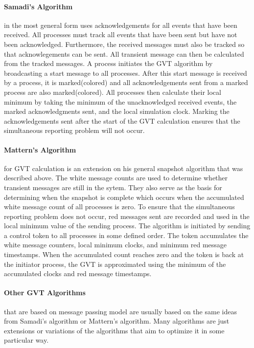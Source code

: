 \documentclass[11pt]{book}
\begin{document}
\paragraph{Samadi's Algorithm}\cite{samadi-85} in the most general form uses acknowledgements
for all events that have been received.  All processes must track all events that have been
sent but have not been acknowledged.  Furthermore, the received messages must also be tracked
so that acknowlegements can be sent.  All transient message can then be calculated from the
tracked messages.  A process initiates the GVT algorithm by broadcasting a start message to
all processes.  After this start message is received by a process, it is marked(colored) and
all acknowledgements sent from a marked process are also marked(colored).  All processes then
calculate their local minimum by taking the minimum of the unacknowledged received events,
the marked acknowledgments sent, and the local simulation clock.  Marking the acknowledgements
sent after the start of the GVT calculation ensures that the simultaneous reporting problem
will not occur.

\paragraph{Mattern's Algorithm}\cite{mattern-93} for GVT calculation is an extension on his
general snapshot algorithm that was described above.  The white message counts are used to
determine whether transient messages are still in the sytem.  They also serve as the basis
for determining when the snapshot is complete which occurs when the accumulated white message
count of all processes is zero.  To ensure that the simultaneous reporting problem does not
occur, red messages sent are recorded and used in the local minimum value of the sending process.
The algorithm is initiated by sending a control token to all processes in some defined order.
The token accumulates the white message counters, local minimum clocks, and minimum red message
timestamps.  When the accumulated count reaches zero and the token is back at the initiator process,
the GVT is approximated using the minimum of the accumulated clocks and red message timestamps.

\paragraph{Other GVT Algorithms} that are based on message passing model are usually based
on the same ideas from Samadi's algorithm or Mattern's algorithm.  Many algorithms are just
extensions or variations of the algorithms that aim to optimize it in some particular way.
\end{document}
